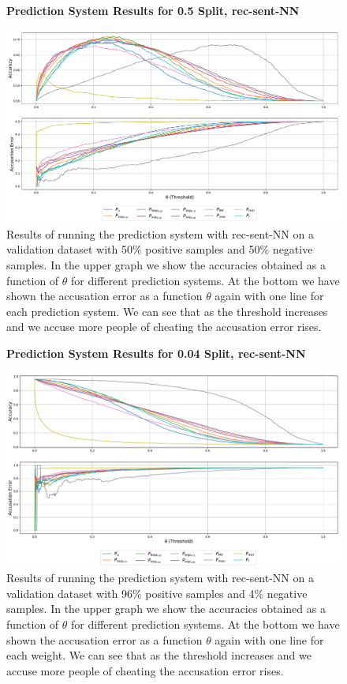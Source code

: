 \begin{figure}
    \centering
    \textbf{Prediction System Results for 0.5 Split, \gls{rec-sent-NN}}\par\medskip
    \includegraphics[scale=0.33]{./pictures/experiments/rec_sent_nn/prediction_system_50}
    \caption{Results of running the prediction system with \gls{rec-sent-NN} on
        a validation dataset with 50\% positive samples and 50\% negative
        samples. In the upper graph we show the accuracies obtained as a
        function of $\theta$ for different prediction systems. At the bottom we
        have shown the accusation error as a function $\theta$ again with one
        line for each prediction system. We can see that as the threshold
        increases and we accuse more people of cheating the accusation error
        rises.}
    \label{fig:rec-sent-NN-pred-50}
\end{figure}

\begin{figure}
    \centering
    \textbf{Prediction System Results for 0.04 Split, \gls{rec-sent-NN}}\par\medskip
    \includegraphics[scale=0.33]{./pictures/experiments/rec_sent_nn/prediction_system_04}
    \caption{Results of running the prediction system with \gls{rec-sent-NN} on
        a validation dataset with 96\% positive samples and 4\% negative
        samples. In the upper graph we show the accuracies obtained as a
        function of $\theta$ for different prediction systems. At the bottom we
        have shown the accusation error as a function $\theta$ again with one
        line for each weight. We can see that as the threshold increases and we
        accuse more people of cheating the accusation error rises.}
    \label{fig:rec-sent-NN-pred-4}
\end{figure}

